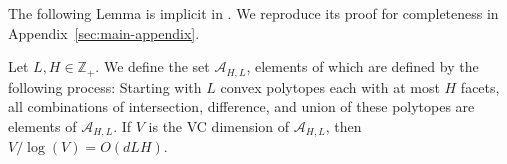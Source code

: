 \documentclass[final,12pt]{colt2018}
\newtheorem{informal theorem}[theorem]{Theorem (informal statement)}
\newcommand{\Z}{\mathbb{Z}}
\begin{document}
The following Lemma is implicit in \cite{DiakonikolasKS17-lc}. We reproduce its proof for completeness in Appendix~\ref{sec:main-appendix}.

\begin{lemma}\label{lem:vc_sets}
Let $L,H \in  {\Z_+}$.
We define the set $\mathcal{A}_{H,L}$, elements of which are defined by the following process: Starting with $L$ convex polytopes each with at most $H$ facets, all combinations of intersection, difference, and union of these polytopes are elements of $\mathcal{A}_{H,L}$.
If $V$ is the VC dimension of $\mathcal{A}_{H,L}$, then $V/\log(V) = O(dLH)$.
\end{lemma}
\end{document}
